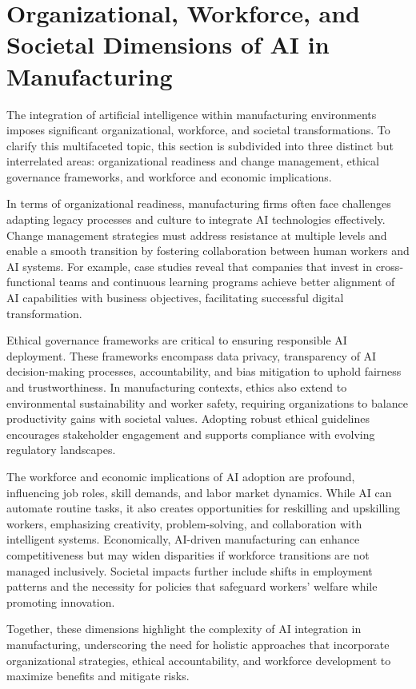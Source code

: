 \documentclass[sigconf]{acmart}
\begin{document}
\section{Organizational, Workforce, and Societal Dimensions of AI in Manufacturing}

The integration of artificial intelligence within manufacturing environments imposes significant organizational, workforce, and societal transformations. To clarify this multifaceted topic, this section is subdivided into three distinct but interrelated areas: organizational readiness and change management, ethical governance frameworks, and workforce and economic implications.

In terms of organizational readiness, manufacturing firms often face challenges adapting legacy processes and culture to integrate AI technologies effectively. Change management strategies must address resistance at multiple levels and enable a smooth transition by fostering collaboration between human workers and AI systems. For example, case studies reveal that companies that invest in cross-functional teams and continuous learning programs achieve better alignment of AI capabilities with business objectives, facilitating successful digital transformation.

Ethical governance frameworks are critical to ensuring responsible AI deployment. These frameworks encompass data privacy, transparency of AI decision-making processes, accountability, and bias mitigation to uphold fairness and trustworthiness. In manufacturing contexts, ethics also extend to environmental sustainability and worker safety, requiring organizations to balance productivity gains with societal values. Adopting robust ethical guidelines encourages stakeholder engagement and supports compliance with evolving regulatory landscapes.

The workforce and economic implications of AI adoption are profound, influencing job roles, skill demands, and labor market dynamics. While AI can automate routine tasks, it also creates opportunities for reskilling and upskilling workers, emphasizing creativity, problem-solving, and collaboration with intelligent systems. Economically, AI-driven manufacturing can enhance competitiveness but may widen disparities if workforce transitions are not managed inclusively. Societal impacts further include shifts in employment patterns and the necessity for policies that safeguard workers’ welfare while promoting innovation.

Together, these dimensions highlight the complexity of AI integration in manufacturing, underscoring the need for holistic approaches that incorporate organizational strategies, ethical accountability, and workforce development to maximize benefits and mitigate risks.
\end{document}
